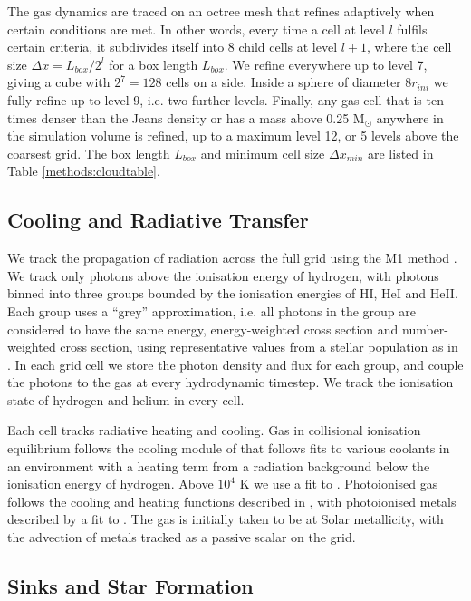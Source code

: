 \documentclass[a4paper,fleqn,usenatbib]{mnras}
\newcommand{\Msolar}{M$_{\odot}$\xspace}
\begin{document}
The gas dynamics are traced on an octree mesh that refines adaptively when certain conditions are met. In other words, every time a cell at level $l$ fulfils certain criteria, it subdivides itself into 8 child cells at level $l+1$, where the cell size $\Delta x = L_{box} / 2^l$ for a box length $L_{box}$. We refine everywhere up to level 7, giving a cube with $2^7=128$ cells on a side. Inside a sphere of diameter $8 r_{ini}$ we fully refine up to level 9, i.e. two further levels. Finally, any gas cell that is ten times denser than the Jeans density or has a mass above 0.25 \Msolar anywhere in the simulation volume is refined, up to a maximum level 12, or 5 levels above the coarsest grid. The box length $L_{box}$ and minimum cell size $\Delta x_{min}$ are listed in Table \ref{methods:cloudtable}.

\subsection{Cooling and Radiative Transfer}

We track the propagation of radiation across the full \AMR grid using the M1 method \citep{Rosdahl2013}. We track only photons above the ionisation energy of hydrogen, with photons binned into three groups bounded by the ionisation energies of HI, HeI and HeII. Each group uses a ``grey'' approximation, i.e. all photons in the group are considered to have the same energy, energy-weighted cross section and number-weighted cross section, using representative values from a stellar population as in \citet{Geen2017}. In each grid cell we store the photon density and flux for each group, and couple the photons to the gas at every hydrodynamic timestep. We track the ionisation state of hydrogen and helium in every \AMR cell.

Each cell tracks radiative heating and cooling. Gas in collisional ionisation equilibrium follows the cooling module of \citet{Audit2005} that follows fits to various coolants in an \ISM environment with a heating term from a radiation background below the ionisation energy of hydrogen. Above $10^4$ K we use a fit to \citet{Sutherland1993}. Photoionised gas follows the cooling and heating functions described in \citet{Rosdahl2013}, with photoionised metals described by a fit to \citet{Ferland2003}. The gas is initially taken to be at Solar metallicity, with the advection of metals tracked as a passive scalar on the \AMR grid.

\subsection{Sinks and Star Formation}
\end{document}
